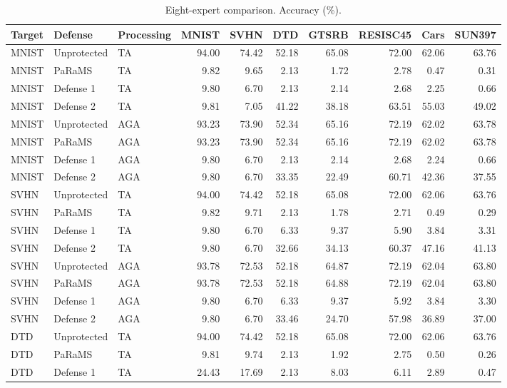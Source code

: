 \begin{table}[t]
\centering\small
\setlength{\tabcolsep}{4pt}
\caption{Eight-expert comparison. Accuracy (\%).}
\label{tab:eight_expert}
\begin{tabular}{@{}lllrrrrrrr@{}}
\toprule
Target & Defense & Processing & MNIST & SVHN & DTD & GTSRB & RESISC45 & Cars & SUN397 \\
\midrule
MNIST & Unprotected & TA & 94.00 & 74.42 & 52.18 & 65.08 & 72.00 & 62.06 & 63.76 \\
MNIST & PaRaMS & TA & 9.82 & 9.65 & 2.13 & 1.72 & 2.78 & 0.47 & 0.31 \\
MNIST & Defense 1 & TA & 9.80 & 6.70 & 2.13 & 2.14 & 2.68 & 2.25 & 0.66 \\
MNIST & Defense 2 & TA & 9.81 & 7.05 & 41.22 & 38.18 & 63.51 & 55.03 & 49.02 \\
\addlinespace
MNIST & Unprotected & AGA & 93.23 & 73.90 & 52.34 & 65.16 & 72.19 & 62.02 & 63.78 \\
MNIST & PaRaMS & AGA & 93.23 & 73.90 & 52.34 & 65.16 & 72.19 & 62.02 & 63.78 \\
MNIST & Defense 1 & AGA & 9.80 & 6.70 & 2.13 & 2.14 & 2.68 & 2.24 & 0.66 \\
MNIST & Defense 2 & AGA & 9.80 & 6.70 & 33.35 & 22.49 & 60.71 & 42.36 & 37.55 \\
\midrule
SVHN & Unprotected & TA & 94.00 & 74.42 & 52.18 & 65.08 & 72.00 & 62.06 & 63.76 \\
SVHN & PaRaMS & TA & 9.82 & 9.71 & 2.13 & 1.78 & 2.71 & 0.49 & 0.29 \\
SVHN & Defense 1 & TA & 9.80 & 6.70 & 6.33 & 9.37 & 5.90 & 3.84 & 3.31 \\
SVHN & Defense 2 & TA & 9.80 & 6.70 & 32.66 & 34.13 & 60.37 & 47.16 & 41.13 \\
\addlinespace
SVHN & Unprotected & AGA & 93.78 & 72.53 & 52.18 & 64.87 & 72.19 & 62.04 & 63.80 \\
SVHN & PaRaMS & AGA & 93.78 & 72.53 & 52.18 & 64.88 & 72.19 & 62.04 & 63.80 \\
SVHN & Defense 1 & AGA & 9.80 & 6.70 & 6.33 & 9.37 & 5.92 & 3.84 & 3.30 \\
SVHN & Defense 2 & AGA & 9.80 & 6.70 & 33.46 & 24.70 & 57.98 & 36.89 & 37.00 \\
\midrule
DTD & Unprotected & TA & 94.00 & 74.42 & 52.18 & 65.08 & 72.00 & 62.06 & 63.76 \\
DTD & PaRaMS & TA & 9.81 & 9.74 & 2.13 & 1.92 & 2.75 & 0.50 & 0.26 \\
DTD & Defense 1 & TA & 24.43 & 17.69 & 2.13 & 8.03 & 6.11 & 2.89 & 0.47 \\

\end{tabular}
\end{table}
